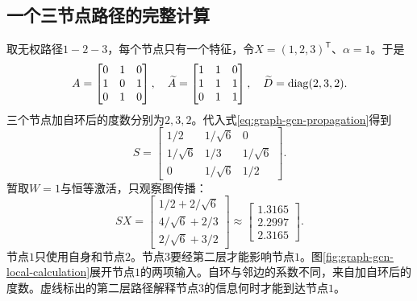 \subsection{一个三节点路径的完整计算}
取无权路径$1-2-3$，每个节点只有一个特征，令$X=(1,2,3)^{\mathsf T}$、$\alpha=1$。于是
\begin{equation}
 A=\begin{bmatrix}0&1&0\\1&0&1\\0&1&0\end{bmatrix},\quad
 \widetilde A=\begin{bmatrix}1&1&0\\1&1&1\\0&1&1\end{bmatrix},\quad
 \widetilde D=\operatorname{diag}(2,3,2).
\end{equation}
三个节点加自环后的度数分别为$2,3,2$。代入式\eqref{eq:graph-gcn-propagation}得到
\begin{equation}
 S=\begin{bmatrix}
 1/2&1/\sqrt6&0\\
 1/\sqrt6&1/3&1/\sqrt6\\
 0&1/\sqrt6&1/2
 \end{bmatrix}.
\end{equation}
暂取$W=1$与恒等激活，只观察图传播：
\begin{equation}
 SX=\begin{bmatrix}1/2+2/\sqrt6\\4/\sqrt6+2/3\\2/\sqrt6+3/2\end{bmatrix}
 \approx\begin{bmatrix}1.3165\\2.2997\\2.3165\end{bmatrix}.
 \label{eq:graph-path-example}
\end{equation}
节点$1$只使用自身和节点$2$。节点$3$要经第二层才能影响节点$1$。图\ref{fig:graph-gcn-local-calculation}展开节点$1$的两项输入。自环与邻边的系数不同，来自加自环后的度数。虚线标出的第二层路径解释节点$3$的信息何时才能到达节点$1$。
